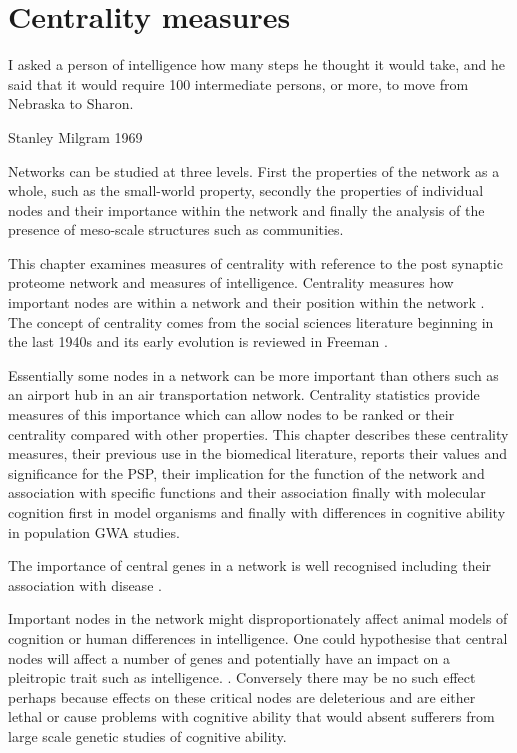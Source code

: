 \chapter{Centrality measures}




 \begin{displayquote}
 I asked a person of intelligence how many steps he thought it would take, and he said that it would require 100 intermediate persons, or more, to move from Nebraska to Sharon. \cite{milgram1967small}
 
 Stanley Milgram 1969
\end{displayquote}




 Networks can be studied at three levels. First the properties of the network as a whole, such as the small-world property, secondly the properties of individual nodes and their importance  within the network and finally the analysis of the presence of meso-scale structures such as communities.

This chapter examines measures of centrality with reference to the post synaptic proteome network and measures of intelligence. Centrality measures how important nodes are within a network \cite{newman2018networks} and their position within the network \cite{freeman1978centrality}. The concept of centrality comes from the social sciences literature beginning in the last 1940s and its early evolution is reviewed in Freeman \cite{freeman1978centrality}.


Essentially some nodes in a network can be more important than others such as an airport hub in an air transportation network.\cite{borenstein1989hubs} Centrality statistics provide measures of this importance which can allow nodes to be ranked or their centrality compared with other properties. This chapter describes these centrality measures, their previous use in the biomedical literature, reports their values and significance for the PSP, their implication for the function of the network and association with specific functions and their association finally with molecular cognition first in model organisms and finally with differences in cognitive ability in population GWA studies.   

 The importance of central genes in a network is well recognised \cite{jeong2001lethality} including their association with disease .
 
 Important nodes in the network might disproportionately affect animal models of cognition or human differences in intelligence. One could hypothesise that central nodes will affect a number of genes and potentially have an impact on a pleitropic trait  such as intelligence. .  Conversely there may be no such effect perhaps because effects on these critical nodes are deleterious and are either lethal or cause problems with cognitive ability that would absent sufferers from large scale genetic studies of cognitive ability. 
 
